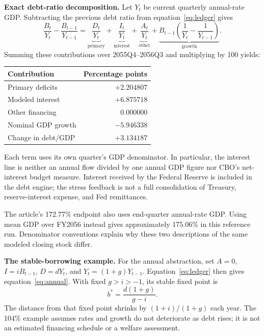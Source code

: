 \documentclass[11pt,letterpaper]{article}
\begin{document}
\textbf{Exact debt-ratio decomposition.}
Let \(Y_t\) be current quarterly annual-rate GDP. Subtracting the previous
debt ratio from equation~\eqref{eq:ledger} gives
\begin{equation}
 \frac{B_t}{Y_t}-\frac{B_{t-1}}{Y_{t-1}}
 =\underbrace{\frac{D_t}{Y_t}}_{\text{primary}}
 +\underbrace{\frac{I_t}{Y_t}}_{\text{interest}}
 +\underbrace{\frac{A_t}{Y_t}}_{\text{other}}
 +\underbrace{B_{t-1}\left(\frac{1}{Y_t}-\frac{1}{Y_{t-1}}\right)}_{\text{growth}}.
 \label{eq:decomposition}
\end{equation}
Summing these contributions over 2055Q4--2056Q3 and multiplying by 100 yields:
\begin{center}
\begin{tabular}{lr}
\toprule
Contribution & Percentage points\\
\midrule
Primary deficits & \(+2.204807\)\\
Modeled interest & \(+6.875718\)\\
Other financing & \(0.000000\)\\
Nominal GDP growth & \(-5.946338\)\\
\midrule
Change in debt/GDP & \(+3.134187\)\\
\bottomrule
\end{tabular}
\end{center}

Each term uses its own quarter's GDP denominator. In particular, the interest
line is neither an annual flow divided by one annual GDP figure nor CBO's
net-interest budget measure. Interest received by the Federal Reserve is
included in the debt engine; the stress feedback is not a full consolidation
of Treasury, reserve-interest expense, and Fed remittances.

The article's 172.77\% endpoint also uses end-quarter annual-rate GDP.
Using mean GDP over FY2056 instead gives approximately 175.06\% in this
reference run. Denominator conventions explain why these two descriptions
of the same modeled closing stock differ.

\textbf{The stable-borrowing example.}
For the annual abstraction, set \(A=0\), \(I=iB_{t-1}\), \(D=dY_t\), and
\(Y_t=(1+g)Y_{t-1}\). Equation~\eqref{eq:ledger} then gives
equation~\eqref{eq:annual}. With fixed \(g>i>-1\), its stable fixed point is
\[
 b^*=\frac{d(1+g)}{g-i}.
\]
The distance from that fixed point shrinks by \((1+i)/(1+g)\) each year.
The 104\% example assumes rates and growth do not deteriorate as debt rises;
it is not an estimated financing schedule or a welfare assessment.
\end{document}
